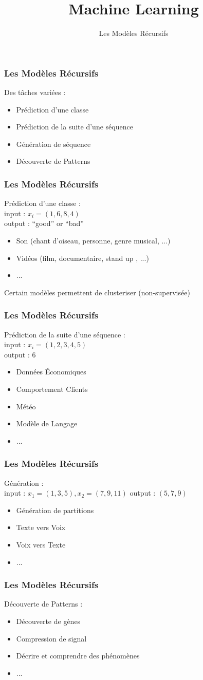 \documentclass{formation}
\title{Machine Learning}
\subtitle{Les Modèles Récursifs}
\begin{document}
\maketitle

\begin{frame}
  \frametitle{Les Modèles Récursifs}
  Des tâches variées :
  \begin{itemize}
  \item Prédiction d'une classe
  \item Prédiction de la suite d'une séquence
  \item Génération de séquence
  \item Découverte de Patterns
  \end{itemize}
\end{frame}

\begin{frame}
  \frametitle{Les Modèles Récursifs}
  Prédiction d'une classe : \\
  input : $x_i=(1,6,8,4)$ \\
  output : ``good'' or ``bad''
  \begin{itemize}
  \item Son (chant d'oiseau, personne, genre musical, ...)
  \item Vidéos (film, documentaire, stand up , ...)
  \item ...
  \end{itemize}
  Certain modèles permettent de clusteriser (non-supervisée)
\end{frame}

\begin{frame}
  \frametitle{Les Modèles Récursifs}
  Prédiction de la suite d'une séquence : \\
  input : $x_i=(1,2,3,4,5)$ \\
  output : 6
  \begin{itemize}
  \item Données Économiques
  \item Comportement Clients
  \item Météo
  \item Modèle de Langage
  \item ...
  \end{itemize}
\end{frame}

\begin{frame}
  \frametitle{Les Modèles Récursifs}
  Génération : \\
  input : $x_1=(1,3,5),x_2=(7,9,11)$
  output : $(5,7,9)$
  \begin{itemize}
  \item Génération de partitions
  \item Texte vers Voix
  \item Voix vers Texte
  \item ...
  \end{itemize}
\end{frame}

\begin{frame}
  \frametitle{Les Modèles Récursifs}
  Découverte de Patterns :
  \begin{itemize}
  \item Découverte de gènes
  \item Compression de signal
  \item Décrire et comprendre des phénomènes
  \item ...
  \end{itemize}
\end{frame}
\end{document}
